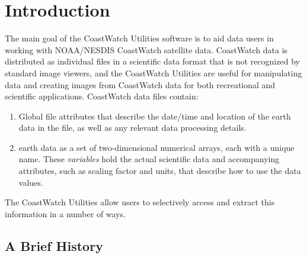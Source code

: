 \chapter{Introduction}

The main goal of the CoastWatch Utilities software is to aid data
users in working with NOAA/NESDIS CoastWatch satellite data. 
CoastWatch data is distributed as individual files in a scientific
data format that is not recognized by standard image viewers, and the
CoastWatch Utilities are useful for manipulating data and creating images
from CoastWatch data for both recreational and scientific
applications.  CoastWatch data files contain:
\begin{enumerate}

  \item Global file attributes that describe the date/time and
  location of the earth data in the file, as well as any relevant data
  processing details.

  \item earth data as a set of two-dimensional numerical arrays, each
  with a unique name.  These {\em variables} hold the actual
  scientific data and accompanying attributes, such as scaling factor
  and units, that describe how to use the data values.

\end{enumerate}
The CoastWatch Utilities allow users to selectively access and extract
this information in a number of ways.

\section{A Brief History}

